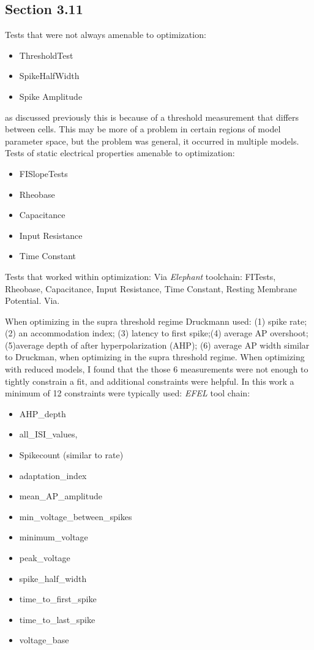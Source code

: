



\subsection{Section 3.11}
Tests that were not always amenable to optimization:
\begin{itemize}
\item ThresholdTest
\item SpikeHalfWidth
\item Spike Amplitude
\end{itemize}
as discussed previously this is because of a threshold measurement that differs between cells. This may be more of a problem in certain regions of model parameter space, but the problem was general, it occurred in multiple models.
Tests of static electrical properties amenable to optimization:
\begin{itemize}
\item FISlopeTests
\item Rheobase
\item Capacitance
\item Input Resistance
\item Time Constant 
\end{itemize}

Tests that worked within optimization:
Via \emph{Elephant} toolchain: FITests, Rheobase, Capacitance, Input Resistance, Time Constant, Resting Membrane Potential.
Via. 

When optimizing in the supra threshold regime Druckmann used:
(1) spike rate; (2) an accommodation index; (3) latency to first spike;(4) average AP overshoot; (5)average depth of after hyperpolarization (AHP); 
(6) average AP width similar to Druckman, when optimizing in the supra threshold regime.
When optimizing with reduced models, I found that the those 6 measurements were not enough to tightly constrain a fit, and additional constraints were helpful. In this work a minimum of 12 constraints were typically used:
\emph{EFEL} tool chain:
\begin{itemize}
\item AHP_depth
\item all_ISI_values,
\item Spikecount (similar to rate)
\item adaptation_index
\item mean_AP_amplitude  
\item min_voltage_between_spikes
\item minimum_voltage
\item peak_voltage
\item spike_half_width
\item time_to_first_spike
\item time_to_last_spike
\item voltage_base
\end{itemize}
